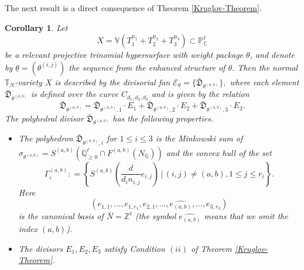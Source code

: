 \documentclass[11pt, reqno]{amsart}
\theoremstyle{plain}
\newtheorem{corollary}[theorem]{Corollary}
\theoremstyle{definition}
\theoremstyle{remark}
\begin{document}
The next result is a direct consequence of Theorem \ref{Kruglov-Theorem}.
\begin{corollary}\label{cor-div-fan-proj-trinom}
Let 
$$X  =  \mathbb{V}(T_{1}^{\underline{n}_{1}} + T_{2}^{\underline{n}_{2}}  + T_{3}^{\underline{n}_{3}})\subset \mathbb{P}_{\mathbb{C}}^{\ell}$$
be a relevant projective trinomial hypersurface with weight package $\theta$, and denote by $\underline{\theta} =  (\theta^{(i,j)})$ the sequence from the enhanced structure of $\theta$. Then the normal $\mathbb{T}_{N}$-variety $X$ is described by the divisorial fan $\mathscr{E}_{\theta} =  \{\bar{\mathfrak{D}}_{\theta^{(a, b)}}\},$ where each element $\bar{\mathfrak{D}}_{\theta^{(a,b)}}$ is defined over the  curve $C_{d_{1}, d_{2}, d_{3}}$ and is given by the relation
$$\bar{\mathfrak{D}}_{\theta^{(a,b)}}  =  \bar{\mathfrak{D}}_{\theta^{(a, b)}, 1}\cdot E_{1} + \bar{\mathfrak{D}}_{\theta^{(a, b)}, 2}\cdot E_{2} + \bar{\mathfrak{D}}_{\theta^{(a, b)}, 3}\cdot E_{3}.$$
The polyhedral divisor $\bar{\mathfrak{D}}_{\theta^{(a,b)}}$ has the following properties. 
\begin{itemize}
\item[$(i)$] The polyhedron $ \bar{\mathfrak{D}}_{\theta^{(a, b)}, i}$ for $1\leq i\leq 3$ is the Minkowski sum of $\sigma_{\theta^{(a, b)}} =  S^{(a,b)}(\mathbb{Q}_{\geq 0}^{\ell}\cap F^{(a, b)}(N_{\mathbb{Q}}))$ and the convex hull of the set 
$$ \Gamma_{i}^{(a, b)}: =  \left\{ S^{(a,b)}\left( \frac{d}{d_{i} n_{i,j}} e_{i,j}\right)\,|\, (i,j)\neq (a, b), 1\leq j\leq r_{i}\right\}.$$
Here
$$(e_{1,1}, \ldots, e_{1, r_{1}}, e_{2, 1}, \ldots, \widehat{e_{(a, b)}}, \ldots, e_{3, r_{3}})$$
is the canonical basis of $\overline{N} =  \mathbb{Z}^{\ell}$ (the symbol $\widehat{e_{(a, b)}}$ means that we omit the index $(a, b)$).
\item[$(ii)$] The divisors $E_{1}, E_{2}, E_{3}$ satisfy Condition $(ii)$ of Theorem \ref{Kruglov-Theorem}.
\end{itemize}
\end{corollary}
\end{document}
